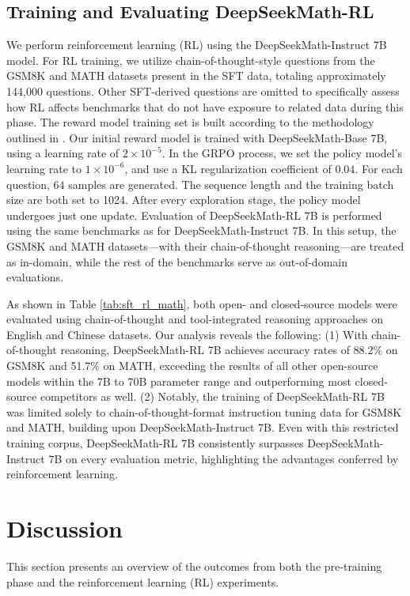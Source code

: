 \begin{itemize}[topsep=0pt]
\begin{itemize}[topsep=0pt]
\subsection{Training and Evaluating DeepSeekMath-RL}

We perform reinforcement learning (RL) using the DeepSeekMath-Instruct 7B model. For RL training, we utilize chain-of-thought-style questions from the GSM8K and MATH datasets present in the SFT data, totaling approximately 144,000 questions. Other SFT-derived questions are omitted to specifically assess how RL affects benchmarks that do not have exposure to related data during this phase. The reward model training set is built according to the methodology outlined in \citep{wang2023math}. Our initial reward model is trained with DeepSeekMath-Base 7B, using a learning rate of $2\times10^{-5}$. In the GRPO process, we set the policy model's learning rate to $1\times10^{-6}$, and use a KL regularization coefficient of $0.04$. For each question, $64$ samples are generated. The sequence length and the training batch size are both set to 1024. After every exploration stage, the policy model undergoes just one update. Evaluation of DeepSeekMath-RL 7B is performed using the same benchmarks as for DeepSeekMath-Instruct 7B. In this setup, the GSM8K and MATH datasets—with their chain-of-thought reasoning—are treated as in-domain, while the rest of the benchmarks serve as out-of-domain evaluations.

As shown in Table \ref{tab:sft_rl_math}, both open- and closed-source models were evaluated using chain-of-thought and tool-integrated reasoning approaches on English and Chinese datasets. Our analysis reveals the following: (1) With chain-of-thought reasoning, DeepSeekMath-RL 7B achieves accuracy rates of 88.2\% on GSM8K and 51.7\% on MATH, exceeding the results of all other open-source models within the 7B to 70B parameter range and outperforming most closed-source competitors as well. (2) Notably, the training of DeepSeekMath-RL 7B was limited solely to chain-of-thought-format instruction tuning data for GSM8K and MATH, building upon DeepSeekMath-Instruct 7B. Even with this restricted training corpus, DeepSeekMath-RL 7B consistently surpasses DeepSeekMath-Instruct 7B on every evaluation metric, highlighting the advantages conferred by reinforcement learning.

\section{Discussion}
This section presents an overview of the outcomes from both the pre-training phase and the reinforcement learning (RL) experiments.


\end{itemize}
\end{itemize}
